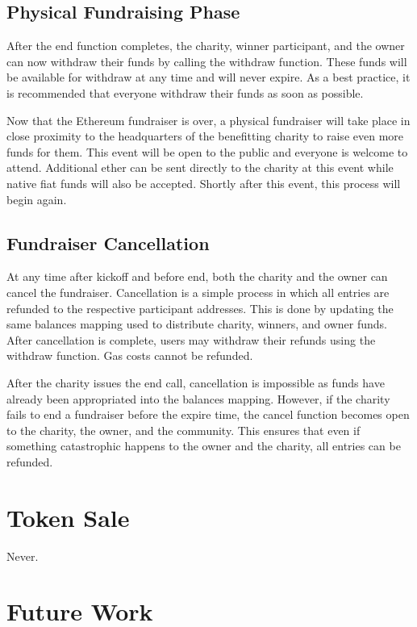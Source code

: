 \documentclass[11pt]{article}
\begin{document}
\subsection{Physical Fundraising Phase}

After the end function completes, the charity, winner participant, and the owner can now withdraw their funds by calling the withdraw function. These funds will be available for withdraw at any time and will never expire. As a best practice, it is recommended that everyone withdraw their funds as soon as possible.

Now that the Ethereum fundraiser is over, a physical fundraiser will take place in close proximity to the headquarters of the benefitting charity to raise even more funds for them. This event will be open to the public and everyone is welcome to attend. Additional ether can be sent directly to the charity at this event while native fiat funds will also be accepted. Shortly after this event, this process will begin again.

\subsection{Fundraiser Cancellation}

At any time after kickoff and before end, both the charity and the owner can cancel the fundraiser. Cancellation is a simple process in which all entries are refunded to the respective participant addresses. This is done by updating the same balances mapping used to distribute charity, winners, and owner funds. After cancellation is complete, users may withdraw their refunds using the withdraw function. Gas costs cannot be refunded.

After the charity issues the end call, cancellation is impossible as funds have already been appropriated into the balances mapping. However, if the charity fails to end a fundraiser before the expire time, the cancel function becomes open to the charity, the owner, and the community. This ensures that even if something catastrophic happens to the owner and the charity, all entries can be refunded.

\section{Token Sale}
Never.

\section{Future Work}
\end{document}
